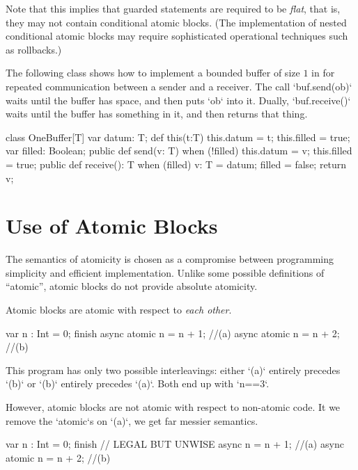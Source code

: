 Note that this implies that guarded statements are required to be {\em
flat}, that is, they may not contain conditional atomic blocks. (The
implementation of nested conditional atomic blocks may require
sophisticated operational techniques such as rollbacks.)


\begin{example}
The following class shows how to implement a bounded buffer of size
$1$ in \Xten{} for repeated communication between a sender and a
receiver.  The call \xcd`buf.send(ob)` waits until the buffer has space, and
then puts \xcd`ob` into it.  Dually, \xcd`buf.receive()` waits until the
buffer has something in it, and then returns that thing.


\begin{xten}
class OneBuffer[T] {
  var datum: T;
  def this(t:T) { this.datum = t; this.filled = true; }
  var filled: Boolean;
  public def send(v: T) {
    when (!filled) {
      this.datum = v;
      this.filled = true;
    }
  }
  public def receive(): T {
    when (filled) {
      v: T = datum;
      filled = false;
      return v;
    }
  }
}
\end{xten}
%
\end{example}

\section{Use of Atomic Blocks}

The semantics of atomicity is chosen as a compromise between programming
simplicity and efficient implementation.  Unlike some possible definitions of
``atomic'', atomic blocks do not provide absolute atomicity.  

Atomic blocks are atomic with respect to {\em each other}.
\begin{xten}
var n : Int = 0;
finish {
  async atomic n = n + 1; //(a)
  async atomic n = n + 2; //(b)
}
\end{xten}
This program has only two possible interleavings: either \xcd`(a)` entirely
precedes \xcd`(b)` or \xcd`(b)` entirely precedes \xcd`(a)`.  Both end up with
\xcd`n==3`. 


However, atomic blocks are not atomic with respect to non-atomic code.  It we
remove the  \xcd`atomic`s on \xcd`(a)`, we get far messier semantics.
\begin{xten}
var n : Int = 0;
finish {
  // LEGAL BUT UNWISE 
  async n = n + 1;          //(a)
  async atomic n = n + 2;   //(b)
}
\end{xten}

